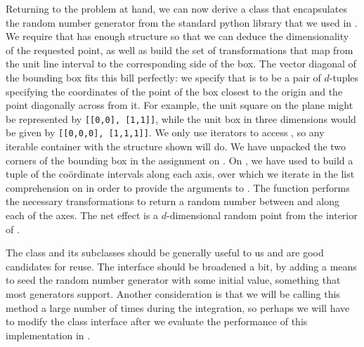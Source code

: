 Returning to the problem at hand, we can now derive a class  that
encapsulates the random number generator from the standard python library that we used in
. We require that  has enough structure so that we can
deduce the dimensionality of the requested point, as well as build the set of transformations
that map from the unit line interval to the corresponding side of the box. The vector diagonal
of the bounding box fits this bill perfectly: we specify that  is to be a pair
of $d$-tuples specifying the coordinates of the point of the box closest to the origin and the
point diagonally across from it. For example, the unit square on the plane might be represented
by \mbox{\tt [[0,0], [1,1]]}, while the unit box in three dimensions would be given by
\mbox{\tt [[0,0,0], [1,1,1]]}.  We only use iterators to access , so any
iterable container with the structure shown will do.
%
%
We have unpacked the two corners of the bounding box in the assignment on
. On , we have used  to build a tuple of
the co\"ordinate intervals along each axis, over which we iterate in the list comprehension on
 in order to provide the arguments to . The function
 performs the necessary transformations to return a random number between
 and  along each of the axes. The net effect is
a $d$-dimensional random point from the interior of .

The class  and its subclasses should be generally useful to us and are good
candidates for reuse. The interface should be broadened a bit, by adding a means to seed the
random number generator with some initial value, something that most generators support.
Another consideration is that we will be calling this method a large number of times during the
integration, so perhaps we will have to modify the class interface after we evaluate the
performance of this implementation in .


